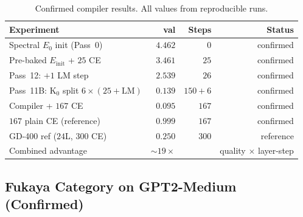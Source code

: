\documentclass[11pt]{amsart}
\begin{document}
\begin{table}[htbp]
\centering\small
\caption{Confirmed compiler results. All values from reproducible runs.}
\label{tab:performance}
\begin{tabular}{lrrr}
\toprule
\textbf{Experiment} & \textbf{val} & \textbf{Steps} & \textbf{Status} \\
\midrule
Spectral $E_0$ init (Pass~0)             & $4.462$  & $0$    & confirmed \\
Pre-baked $E_\mathrm{init}$ + $25$ CE    & $3.461$  & $25$   & confirmed \\
Pass~12: $+1$ LM step                    & $2.539$  & $26$   & confirmed \\
Pass~11B: K$_0$ split $6\times(25+\mathrm{LM})$ & $0.139$ & $150+6$ & confirmed \\
Compiler + $167$ CE                      & $0.095$  & $167$  & confirmed \\
$167$ plain CE (reference)               & $0.999$  & $167$  & confirmed \\
GD-400 ref ($24$L, $300$ CE)             & $0.250$  & $300$  & reference \\
\midrule
Combined advantage                       & $\sim\!19\times$ & & quality $\times$ layer-step \\
\bottomrule
\end{tabular}
\end{table}

\subsection{Fukaya Category on GPT2-Medium (Confirmed)}
\end{document}
